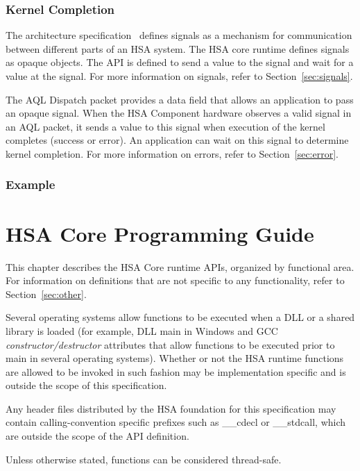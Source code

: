 \documentclass[final]{book}
\begin{document}
\subsection{Kernel Completion}
The architecture specification~\cite{sar} defines signals as a mechanism for
communication between different parts of an HSA system. The HSA core runtime
defines signals as opaque objects. The API is defined to send a value to the
signal and wait for a value at the signal. For more information on signals,
refer to Section~\ref{sec:signals}.

The AQL Dispatch packet provides a data field that allows an application to pass
an opaque signal. When the HSA Component hardware observes a valid signal in
an AQL packet, it sends a value to this signal when execution of the kernel
completes (success or error). An application can wait on this signal to determine
kernel completion. For more information on errors, refer to
Section~\ref{sec:error}.

\subsection{Example}


\chapter{HSA Core Programming Guide} \label{coreapi}

This chapter describes the HSA Core runtime APIs, organized by functional
area. For information on definitions that are not specific to any functionality,
refer to Section~\ref{sec:other}.

Several operating systems allow functions to be executed when a DLL or a shared
library is loaded (for example, DLL main in Windows and GCC
\emph{constructor/destructor} attributes that allow functions to be executed
prior to main in several operating systems). Whether or not the HSA runtime
functions are allowed to be invoked in such fashion may be implementation
specific and is outside the scope of this specification.

Any header files distributed by the HSA foundation for this specification may
contain calling-convention specific prefixes such as __cdecl or __stdcall, which
are outside the scope of the API definition.

Unless otherwise stated, functions can be considered thread-safe.
\end{document}
